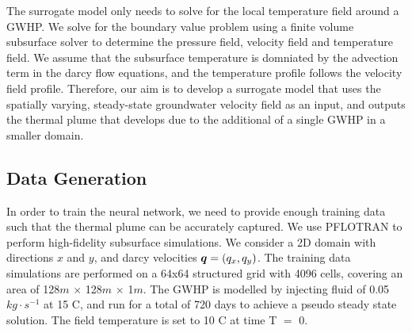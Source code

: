 \documentclass{article} %
\begin{document}
The surrogate model only needs to solve for the local temperature field around a GWHP. 
We solve for the boundary value problem using a finite volume subsurface solver to determine the pressure field, velocity field and temperature field. 
We assume that the subsurface temperature is domniated by the advection term in the darcy flow equations, and the temperature profile follows the velocity field profile. 
Therefore, our aim is to develop a surrogate model that uses the spatially varying, steady-state groundwater velocity field as an input, and outputs the thermal plume that develops due to the additional of a single GWHP in a smaller domain. 


\subsection*{Data Generation}


In order to train the neural network, we need to provide enough training data such that the thermal plume can be accurately captured. We use PFLOTRAN \citep{pflotran-paper} to perform high-fidelity subsurface simulations. We consider a 2D domain with directions $x$ and $y$, and darcy velocities ${\bm{q}} = (q_x, q_y)$.
The training data simulations are performed on a 64x64 structured grid with 4096 cells, covering an area of 128$m$ $\times$ 128$m$ $\times$ 1$m$. The GWHP is modelled by injecting fluid of 0.05 $kg \cdot s^{-1}$ at 15 \degree C, and run for a total of 720 days to achieve a pseudo steady state solution. The field temperature is set to 10 \degree C at time T $=$ 0.



\end{document}
